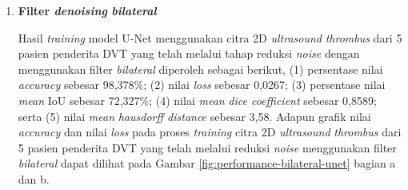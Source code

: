 \begin{enumerate}
	\item \textbf{Filter \textit{denoising} \textit{bilateral}}
	
	Hasil \textit{training} model U-Net menggunakan citra 2D \textit{ultrasound} \textit{thrombus} dari 5 pasien penderita DVT yang telah melalui tahap reduksi \textit{noise} dengan menggunakan filter \textit{bilateral} diperoleh sebagai berikut, (1) persentase nilai \textit{accuracy} sebesar 98,378\%; (2) nilai \textit{loss} sebesar 0,0267; (3) persentase nilai \textit{mean} IoU sebesar 72,327\%; (4) nilai \textit{mean} \textit{dice coefficient} sebesar 0,8589; serta (5) nilai \textit{mean} \textit{hausdorff distance} sebesar 3,58. Adapun grafik nilai \textit{accuracy} dan nilai \textit{loss} pada proses \textit{training} citra 2D \textit{ultrasound} \textit{thrombus} dari 5 pasien penderita DVT yang telah melalui reduksi \textit{noise} menggunakan filter \textit{bilateral} dapat dilihat pada Gambar \ref{fig:performance-bilateral-unet} bagian a dan b.
	

\end{enumerate}
